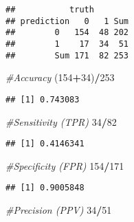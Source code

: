 \documentclass[]{article}
\newenvironment{Shaded}{\begin{snugshade}}{\end{snugshade}}
\newcommand{\CommentTok}[1]{\textcolor[rgb]{0.56,0.35,0.01}{\textit{#1}}}
\newcommand{\DataTypeTok}[1]{\textcolor[rgb]{0.13,0.29,0.53}{#1}}
\newcommand{\DecValTok}[1]{\textcolor[rgb]{0.00,0.00,0.81}{#1}}
\newcommand{\KeywordTok}[1]{\textcolor[rgb]{0.13,0.29,0.53}{\textbf{#1}}}
\newcommand{\NormalTok}[1]{#1}
\newcommand{\OperatorTok}[1]{\textcolor[rgb]{0.81,0.36,0.00}{\textbf{#1}}}
\begin{document}
\begin{Shaded}
\end{Shaded}

\begin{verbatim}
##           truth
## prediction   0   1 Sum
##        0   154  48 202
##        1    17  34  51
##        Sum 171  82 253
\end{verbatim}

\begin{Shaded}
\begin{Highlighting}[]
\CommentTok{#Accuracy}
\NormalTok{(}\DecValTok{154}\OperatorTok{+}\DecValTok{34}\NormalTok{)}\OperatorTok{/}\DecValTok{253}
\end{Highlighting}
\end{Shaded}

\begin{verbatim}
## [1] 0.743083
\end{verbatim}

\begin{Shaded}
\begin{Highlighting}[]
\CommentTok{#Sensitivity (TPR)}
\DecValTok{34}\OperatorTok{/}\DecValTok{82}
\end{Highlighting}
\end{Shaded}

\begin{verbatim}
## [1] 0.4146341
\end{verbatim}

\begin{Shaded}
\begin{Highlighting}[]
\CommentTok{#Specificity (FPR)}
\DecValTok{154}\OperatorTok{/}\DecValTok{171}
\end{Highlighting}
\end{Shaded}

\begin{verbatim}
## [1] 0.9005848
\end{verbatim}

\begin{Shaded}
\begin{Highlighting}[]
\CommentTok{#Precision (PPV)}
\DecValTok{34}\OperatorTok{/}\DecValTok{51}
\end{Highlighting}
\end{Shaded}
\end{document}
